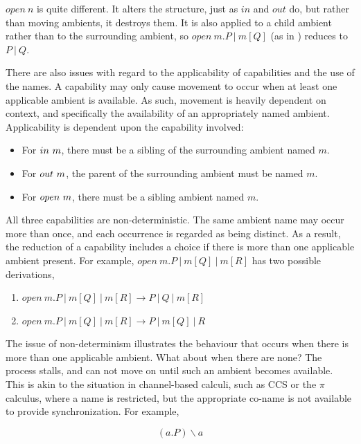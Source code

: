 $open\ n$ is quite different.  It alters the structure, just as $in$ and
$out$ do, but rather than moving ambients, it destroys them.  It is also
applied to a child ambient rather than to the surrounding ambient, so
$open\ m.P\ |\ m[Q]$ (as in \cite{amb}) reduces to $P\ |\ Q$.

There are also issues with regard to the applicability of capabilities
and the use of the names.  A capability may only cause movement to occur
when at least one applicable ambient is available.  As such, movement
is heavily dependent on context, and specifically the availability of an
appropriately named ambient.  Applicability is dependent upon the
capability involved:

\begin{itemize}
\item For $in\ m$, there must be a sibling of the surrounding
ambient named $m$.
\item For $out\ m$, the parent of the surrounding ambient must be
named $m$.
\item For $open\ m$, there must be a sibling ambient named $m$.
\end{itemize}

All three capabilities are non-deterministic.  The same ambient name may
occur more than once, and each occurrence is regarded as being distinct.
As a result, the reduction of a capability includes a choice if there is
more than one applicable ambient present.  For example, $open\ m.P\ |\
m[Q]\ |\ m[R]$ has two possible derivations,

\begin{enumerate}
\item $open\ m.P\ |\ m[Q]\ |\ m[R] \rightarrow P\ |\ Q\ |\ m[R]$
\item $open\ m.P\ |\ m[Q]\ |\ m[R] \rightarrow P\ |\ m[Q]\ |\ R$
\end{enumerate}

The issue of non-determinism illustrates the behaviour that occurs when
there is more than one applicable ambient.  What about when there are
none?  The process stalls, and can not move on until such an ambient
becomes available.  This is akin to the situation in channel-based
calculi, such as CCS or the $\pi$ calculus, where a name is restricted,
but the appropriate co-name is not available to provide synchronization.
For example,

\begin{equation}
(a.P) \backslash a 
\end{equation}

